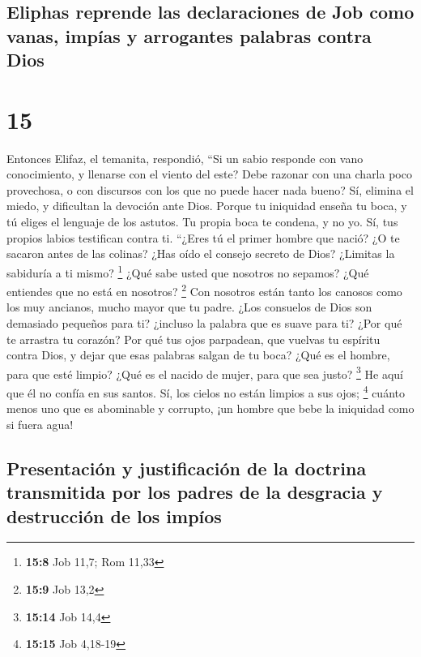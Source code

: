 \begin{paracol}{2}
{\subsection{Eliphas reprende las declaraciones de Job como vanas, impías
y arrogantes palabras contra
Dios}\label{eliphas-reprende-las-declaraciones-de-job-como-vanas-impuxedas-y-arrogantes-palabras-contra-dios}}

\hypertarget{section-28}{%
\section{15}\label{section-28}}

 Entonces Elifaz, el temanita, respondió, 
``Si un sabio responde con vano conocimiento, y llenarse con el viento
del este?  Debe razonar con una charla poco provechosa, o
con discursos con los que no puede hacer nada bueno?  Sí,
elimina el miedo, y dificultan la devoción ante Dios. 
Porque tu iniquidad enseña tu boca, y tú eliges el lenguaje de los
astutos.  Tu propia boca te condena, y no yo. Sí, tus
propios labios testifican contra ti.  ``¿Eres tú el primer
hombre que nació? ¿O te sacaron antes de las colinas? 
¿Has oído el consejo secreto de Dios? ¿Limitas la sabiduría a ti mismo?
\footnote{\textbf{15:8} Job 11,7; Rom 11,33}  ¿Qué sabe
usted que nosotros no sepamos? ¿Qué entiendes que no está en nosotros?
\footnote{\textbf{15:9} Job 13,2}  Con nosotros están
tanto los canosos como los muy ancianos, mucho mayor que tu padre.
 ¿Los consuelos de Dios son demasiado pequeños para ti?
¿incluso la palabra que es suave para ti?  ¿Por qué te
arrastra tu corazón? Por qué tus ojos parpadean,  que
vuelvas tu espíritu contra Dios, y dejar que esas palabras salgan de tu
boca?  ¿Qué es el hombre, para que esté limpio? ¿Qué es
el nacido de mujer, para que sea justo? \footnote{\textbf{15:14} Job
  14,4}  He aquí que él no confía en sus santos. Sí, los
cielos no están limpios a sus ojos; \footnote{\textbf{15:15} Job 4,18-19}
 cuánto menos uno que es abominable y corrupto, ¡un
hombre que bebe la iniquidad como si fuera agua!

\hypertarget{presentaciuxf3n-y-justificaciuxf3n-de-la-doctrina-transmitida-por-los-padres-de-la-desgracia-y-destrucciuxf3n-de-los-impuxedos}{%
\subsection{Presentación y justificación de la doctrina transmitida por
los padres de la desgracia y destrucción de los
impíos}\label{presentaciuxf3n-y-justificaciuxf3n-de-la-doctrina-transmitida-por-los-padres-de-la-desgracia-y-destrucciuxf3n-de-los-impuxedos}}


\end{paracol}
